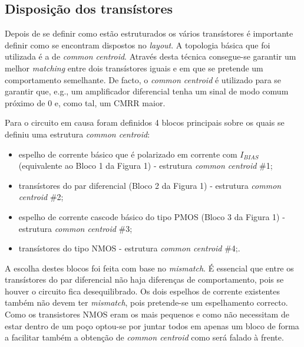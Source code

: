 \documentclass[11pt]{article}
\numberwithin{equation}{section}
\begin{document}

\subsection{Disposição dos transístores}

Depois de se definir como estão estruturados os vários transístores é importante definir como se encontram dispostos no \textit{layout}. A topologia básica que foi utilizada é a de \textit{common centroid}. Através desta técnica consegue-se garantir um melhor \textit{matching} entre dois transístores iguais e em que se pretende um comportamento semelhante. De facto, o \textit{common centroid} é utilizado para se garantir que, e.g., um amplificador diferencial tenha um sinal de modo comum próximo de 0 e, como tal, um CMRR maior.

Para o circuito em causa foram definidos 4 blocos principais sobre os quais se definiu uma estrutura \textit{common centroid}:

\vspace{-2mm}

\begin{itemize}
	\item espelho de corrente básico que é polarizado em corrente com $I_{BIAS}$ (equivalente ao Bloco 1 da Figura 1) - estrutura \textit{common centroid} \#1;
	\vspace{-2mm}
	\item transístores do par diferencial (Bloco 2 da Figura 1) - estrutura \textit{common centroid} \#2;
	\vspace{-2mm}
	\item espelho de corrente cascode básico do tipo PMOS (Bloco 3 da Figura 1) - estrutura \textit{common centroid} \#3;
	\vspace{-2mm}
	\item transístores do tipo NMOS - estrutura \textit{common centroid} \#4;.
\end{itemize}

A escolha destes blocos foi feita com base no \textit{mismatch}. É essencial que entre os transístores do par diferencial não haja diferenças de comportamento, pois se houver o circuito fica desequilibrado. Os dois espelhos de corrente existentes também não devem ter \textit{mismatch}, pois pretende-se um espelhamento correcto. Como os transistores NMOS eram os mais pequenos e como não necessitam de estar dentro de um poço optou-se por juntar todos em apenas um bloco de forma a facilitar também a obtenção de \textit{common centroid} como será falado à frente.
\end{document}
